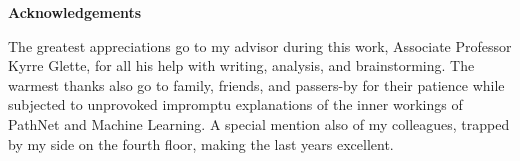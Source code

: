 
\newenvironment{acknowledgements}%
    {\cleardoublepage\thispagestyle{empty}\null\vfill\begin{center}%
    \bfseries Acknowledgements\end{center}}%
    {\vfill\null}
        \begin{acknowledgements}
The greatest appreciations go to my advisor during this work, Associate Professor Kyrre Glette, for all his help with writing, analysis, and brainstorming.
\newline\newline
The warmest thanks also go to family, friends, and passers-by for their patience while subjected to unprovoked impromptu explanations of the inner workings of PathNet and Machine Learning.
\newline\newline
A special mention also of my colleagues, trapped by my side on the fourth floor, making the last years excellent.

        \end{acknowledgements}


